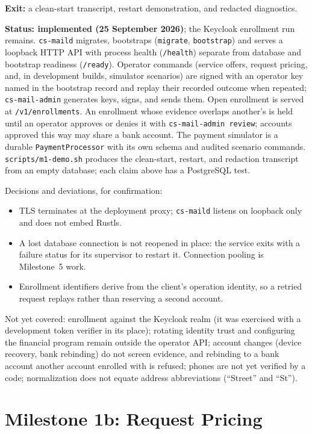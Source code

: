 \documentclass[11pt]{article}
\begin{document}
\textbf{Exit:} a clean-start transcript, restart demonstration, and redacted
diagnostics.

\textbf{Status: implemented (25 September 2026)}; the Keycloak enrollment run
remains. \texttt{cs-maild} migrates, bootstraps (\texttt{migrate},
\texttt{bootstrap}) and serves a loopback HTTP API with process health
(\texttt{/health}) separate from database and bootstrap readiness
(\texttt{/ready}). Operator commands (service offers, request pricing, and, in
development builds, simulator scenarios) are signed with an operator key named in
the bootstrap record and replay their recorded outcome when repeated;
\texttt{cs-mail-admin} generates keys, signs, and sends them. Open enrollment is
served at \texttt{/v1/enrollments}. An enrollment whose evidence overlaps another's is
held until an operator approves or denies it with \texttt{cs-mail-admin review};
accounts approved this way may share a bank account. The payment simulator is a durable \texttt{PaymentProcessor} with its own
schema and audited scenario commands. \texttt{scripts/m1-demo.sh} produces the
clean-start, restart, and redaction transcript from an empty database; each claim
above has a PostgreSQL test.

Decisions and deviations, for confirmation:
\begin{itemize}[nosep]
\item TLS terminates at the deployment proxy; \texttt{cs-maild} listens on loopback
  only and does not embed Rustls.
\item A lost database connection is not reopened in place: the service exits with a
  failure status for its supervisor to restart it. Connection pooling is Milestone~5
  work.
\item Enrollment identifiers derive from the client's operation identity, so a
  retried request replays rather than reserving a second account.
\end{itemize}

Not yet covered: enrollment against the Keycloak realm (it was exercised with a
development token verifier in its place); rotating identity trust and configuring
the financial program remain outside the operator API; account changes (device
recovery, bank rebinding) do not screen evidence, and rebinding to a bank account
another account enrolled with is refused; phones are not yet verified by a code;
normalization does not equate address abbreviations (``Street'' and ``St'').

\section{Milestone 1b: Request Pricing}
\end{document}

